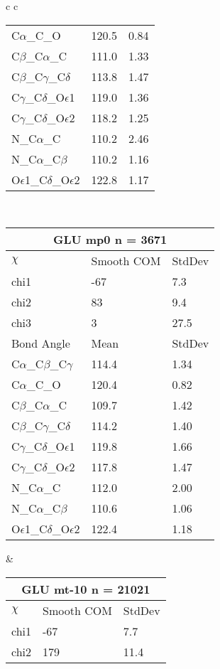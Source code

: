 \begin{longtable}{ c c }
\begin{tabular}{ l l l }
  C$\alpha$\_C\_O & 120.5 & 0.84\\
  C$\beta$\_C$\alpha$\_C & 111.0 & 1.33\\
  C$\beta$\_C$\gamma$\_C$\delta$ & 113.8 & 1.47\\
  C$\gamma$\_C$\delta$\_O$\epsilon$1 & 119.0 & 1.36\\
  C$\gamma$\_C$\delta$\_O$\epsilon$2 & 118.2 & 1.25\\
  N\_C$\alpha$\_C & 110.2 & 2.46\\
  N\_C$\alpha$\_C$\beta$ & 110.2 & 1.16\\
  O$\epsilon$1\_C$\delta$\_O$\epsilon$2 & 122.8 & 1.17\\
  \bottomrule
  \end{tabular}
  \\
  \begin{tabular}{ l l l }
  \toprule
  \multicolumn{3}{c}{GLU \textbf{mp0} n = 3671} \\ \toprule
  $\chi$       & Smooth COM & StdDev \\ \midrule
  chi1 & -67 & 7.3 \\ 
  chi2 & 83 & 9.4 \\ 
  chi3 & 3 & 27.5 \\ \midrule
  Bond Angle   & Mean     & StdDev \\ \midrule
  C$\alpha$\_C$\beta$\_C$\gamma$ & 114.4 & 1.34\\
  C$\alpha$\_C\_O & 120.4 & 0.82\\
  C$\beta$\_C$\alpha$\_C & 109.7 & 1.42\\
  C$\beta$\_C$\gamma$\_C$\delta$ & 114.2 & 1.40\\
  C$\gamma$\_C$\delta$\_O$\epsilon$1 & 119.8 & 1.66\\
  C$\gamma$\_C$\delta$\_O$\epsilon$2 & 117.8 & 1.47\\
  N\_C$\alpha$\_C & 112.0 & 2.00\\
  N\_C$\alpha$\_C$\beta$ & 110.6 & 1.06\\
  O$\epsilon$1\_C$\delta$\_O$\epsilon$2 & 122.4 & 1.18\\
  \bottomrule
  \end{tabular}
  &
  \begin{tabular}{ l l l }
  \toprule
  \multicolumn{3}{c}{GLU \textbf{mt-10} n = 21021} \\ \toprule
  $\chi$       & Smooth COM & StdDev \\ \midrule
  chi1 & -67 & 7.7 \\ 
  chi2 & 179 & 11.4 \\ 

\end{tabular}
\end{longtable}
